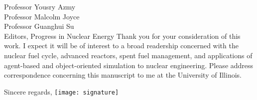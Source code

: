 \documentclass[11pt]{letter} %
\begin{document}
\begin{letter}{Professor Yousry Azmy\\
Professor Malcolm Joyce\\
Professor Guanghui Su\\
Editors, Progress in Nuclear Energy}
Thank you for your consideration of this work. I expect it will be of interest
to a broad readership concerned with the nuclear fuel cycle, advanced reactors,
spent fuel management, and applications of agent-based and object-oriented
simulation to nuclear engineering.  Please address correspondence concerning
this manuscript to me at the University of Illinois.

\closing{Sincere regards,
\texttt{[image: signature]}\\
}


\end{letter}
\end{document}
